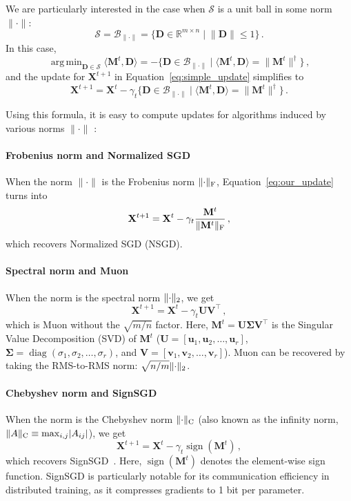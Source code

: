 \documentclass[a4paper,14pt,oneside]{extarticle}
\newcommand{\R}{\mathbb{R}} %
\newcommand{\norm}[1]{\lVert #1\rVert}
\DeclarePairedDelimiter{\normf}{\|}{\|_\mathrm{F}}
\DeclarePairedDelimiter{\norms}{\|}{\|_{\mathrm{2}}}
\DeclarePairedDelimiter{\normc}{\|}{\|_{\mathrm{C}}}
\DeclarePairedDelimiter{\abs}{\lvert}{\rvert}
\def\<#1,#2>{\langle #1,#2\rangle}
\DeclareMathOperator{\diag}{diag}
\DeclareMathOperator*{\argmin}{arg\,min}
\DeclareMathOperator{\sign}{sign}
\newcommand{\Rmn}{\R^{m\times n}}
\newcommand{\vu}{\mathbf{u}}
\newcommand{\vv}{\mathbf{v}}
\newcommand{\mX}{\mathbf{X}}
\newcommand{\mM}{\mathbf{M}}
\newcommand{\mD}{\mathbf{D}}
\newcommand{\mU}{\mathbf{U}}
\newcommand{\mV}{\mathbf{V}}
\newcommand{\mSigma}{\mathbf{\Sigma}}
\newcommand{\cS}{\mathcal{S}}
\newcommand{\cB}{\mathcal{B}}
\newcommand{\equationref}[1]{Equation~\ref{#1}}
\begin{document}
We are particularly interested in the case when $\cS$ is a unit ball in some norm $\norm{\cdot}$:
\[
\cS = \cB_{\norm{\cdot}} = \{ \mD \in \Rmn \mid \norm{\mD} \leq 1 \}\,.
\]
In this case,
\[
\argmin_{\mD \in \cS} \<\mM^t, \mD> = - \{ \mD \in \cB_{\norm{\cdot}} \mid \<\mM^t, \mD> = \norm{\mM^t}^\dagger\}\,,
\]
and the update for $\mX^{t + 1}$ in \equationref{eq:simple_update} simplifies to
\begin{equation}\label{eq:our_update}
  \mX^{t+1} = \mX^{t} - \gamma_t \{\mD \in \cB_{\norm{\cdot}} \mid \<\mM^t, \mD> = \norm{\mM^t}^\dagger\}\,.
\end{equation}

Using this formula, it is easy to compute updates for algorithms induced by various norms $\norm{\cdot}$ \citep{bernstein2024oldoptimizernewnorm, pethick2025training}:

\paragraph{Frobenius norm and Normalized SGD}
When the norm $\norm{\cdot}$ is the Frobenius norm $\normf{\cdot}$, \equationref{eq:our_update} turns into
\begin{equation}\label{eq:nsgd_update}
  \mX^{t+1} = \mX^{t} - \gamma_t \frac{\mM^t}{\normf{\mM^t}}\,,
\end{equation}
which recovers Normalized SGD (NSGD).

\paragraph{Spectral norm and Muon}
When the norm is the spectral norm $\norms{\cdot}$, we get
\begin{equation}\label{eq:muon_update}
  \mX^{t+1} = \mX^{t} - \gamma_t \mU \mV^\top\,,
\end{equation}
which is Muon without the $\sqrt{m/n}$ factor.
Here, $\mM^t = \mU \mSigma \mV^\top$ is the Singular Value Decomposition (SVD) of $\mM^t$ ($\mU = [\vu_1, \vu_2, \dots, \vu_r]$, $\mSigma = \diag(\sigma_1, \sigma_2, \dots, \sigma_r)$, and $\mV = [\vv_1, \vv_2, \dots, \vv_r]$). Muon can be recovered by taking the RMS-to-RMS norm: $\sqrt{n/m}\norms{\cdot}$.

\paragraph{Chebyshev norm and SignSGD}
When the norm is the Chebyshev norm $\normc{\cdot}$ (also known as the infinity norm, $\normc{A} \equiv \max_{i,j}\abs{A_{ij}}$), we get
\begin{equation}\label{eq:signsgd_update}
  \mX^{t+1} = \mX^{t} - \gamma_t \sign(\mM^t)\,,
\end{equation}
which recovers SignSGD~\citep{bernstein2018signsgd}. Here, $\sign(\mM^t)$ denotes the element-wise sign function. SignSGD is particularly notable for its communication efficiency in distributed training, as it compresses gradients to 1 bit per parameter.
\end{document}
